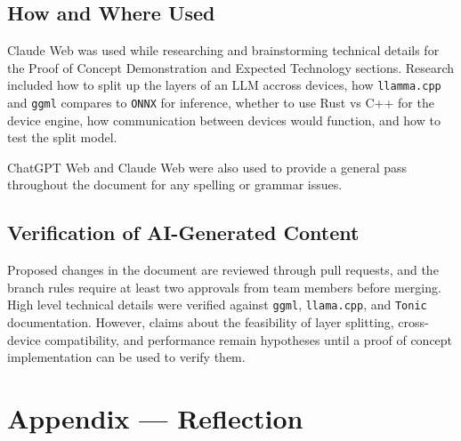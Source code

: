 \documentclass{article}
\begin{document}
\subsection{How and Where Used}

Claude Web was used while researching and brainstorming technical details for the Proof of Concept Demonstration and Expected Technology sections. Research included how to split up the layers of an LLM accross devices, how \verb|llamma.cpp| and \verb|ggml| compares to \verb|ONNX| for inference, whether to use Rust vs C++ for the device engine, how communication between devices would function, and how to test the split model.

ChatGPT Web and Claude Web were also used to provide a general pass throughout the document for any spelling or grammar issues.

\subsection{Verification of AI-Generated Content}

Proposed changes in the document are reviewed through pull requests, and the branch rules require at least two approvals from team members before merging. High level technical details were verified against \verb|ggml|, \verb|llama.cpp|, and \verb|Tonic| documentation. However, claims about the feasibility of layer splitting, cross-device compatibility, and performance remain hypotheses until a proof of concept implementation can be used to verify them.

\newpage{}

\section*{Appendix --- Reflection}


\end{document}
